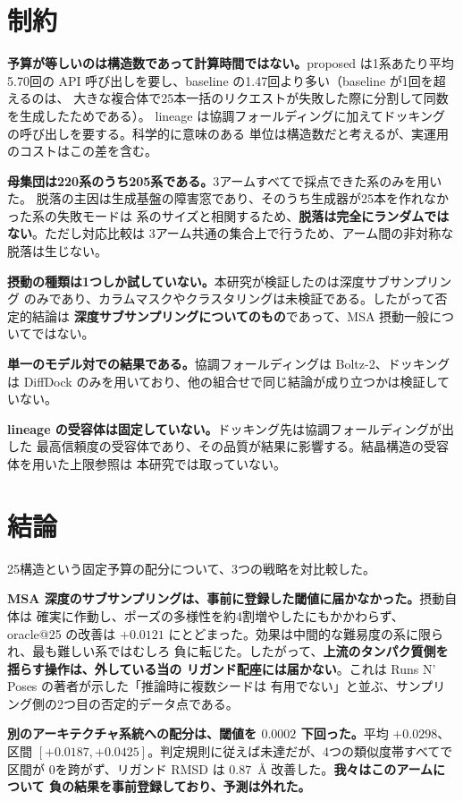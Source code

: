 \documentclass[11pt]{article}
\begin{document}
\section{制約}

\textbf{予算が等しいのは構造数であって計算時間ではない。}proposed は1系あたり平均
5.70回の API 呼び出しを要し、baseline の1.47回より多い（baseline が1回を超えるのは、
大きな複合体で25本一括のリクエストが失敗した際に分割して同数を生成したためである）。
lineage は協調フォールディングに加えてドッキングの呼び出しを要する。科学的に意味のある
単位は構造数だと考えるが、実運用のコストはこの差を含む。

\textbf{母集団は220系のうち205系である。}3アームすべてで採点できた系のみを用いた。
脱落の主因は生成基盤の障害窓であり、そのうち生成器が25本を作れなかった系の失敗モードは
系のサイズと相関するため、\textbf{脱落は完全にランダムではない}。ただし対応比較は
3アーム共通の集合上で行うため、アーム間の非対称な脱落は生じない。

\textbf{摂動の種類は1つしか試していない。}本研究が検証したのは深度サブサンプリング
のみであり、カラムマスクやクラスタリングは未検証である。したがって否定的結論は
\textbf{深度サブサンプリングについてのもの}であって、MSA 摂動一般についてではない。

\textbf{単一のモデル対での結果である。}協調フォールディングは Boltz-2、ドッキングは
DiffDock のみを用いており、他の組合せで同じ結論が成り立つかは検証していない。

\textbf{lineage の受容体は固定していない。}ドッキング先は協調フォールディングが出した
最高信頼度の受容体であり、その品質が結果に影響する。結晶構造の受容体を用いた上限参照は
本研究では取っていない。

\section{結論}

25構造という固定予算の配分について、3つの戦略を対比較した。

\textbf{MSA 深度のサブサンプリングは、事前に登録した閾値に届かなかった。}摂動自体は
確実に作動し、ポーズの多様性を約4割増やしたにもかかわらず、oracle@25 の改善は
$+0.0121$ にとどまった。効果は中間的な難易度の系に限られ、最も難しい系ではむしろ
負に転じた。したがって、\textbf{上流のタンパク質側を揺らす操作は、外している当の
リガンド配座には届かない}。これは Runs N' Poses の著者が示した「推論時に複数シードは
有用でない」と並ぶ、サンプリング側の2つ目の否定的データ点である。

\textbf{別のアーキテクチャ系統への配分は、閾値を $0.0002$ 下回った。}平均 $+0.0298$、
区間 $[+0.0187, +0.0425]$。判定規則に従えば未達だが、4つの類似度帯すべてで区間が
0を跨がず、リガンド RMSD は $0.87$~\AA{} 改善した。\textbf{我々はこのアームについて
負の結果を事前登録しており、予測は外れた。}
\end{document}
